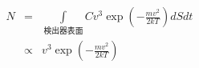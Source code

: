 
\begin{eqnarray*}
N &=&
\int\limits_{\text{} 検出器表面}Cv^3\exp(-\frac{mv^2}{2kT})dSdt \\
&\propto& v^3\exp(-\frac{mv^2}{2kT})
\end{eqnarray*}
